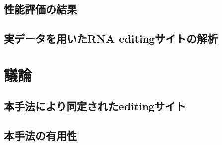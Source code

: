 \subsection{性能評価の結果}
\subsection{実データを用いたRNA editingサイトの解析}

\section{議論}
\subsection{本手法により同定されたeditingサイト}
\subsection{本手法の有用性}
